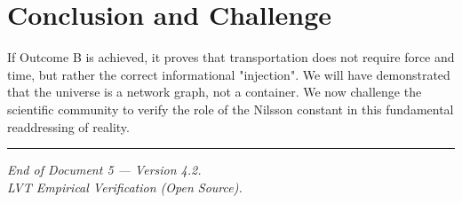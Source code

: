 \documentclass[12pt,a4paper]{article}
\begin{document}
\section{Conclusion and Challenge}
If Outcome B is achieved, it proves that transportation does not require force and time, but rather the correct informational "injection". We will have demonstrated that the universe is a network graph, not a container. We now challenge the scientific community to verify the role of the Nilsson constant in this fundamental readdressing of reality.

\vspace{2em}
\hrule
\vspace{0.5em}
\begin{center}
\small\textit{End of Document 5 --- Version 4.2. \\
LVT Empirical Verification (Open Source).}
\end{center}
\end{document}
